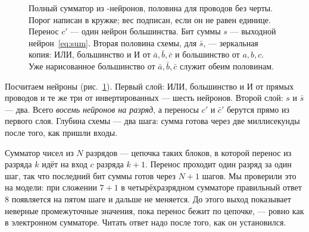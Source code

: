 \begin{figure}[t]
\centering
{}
\caption{Полный сумматор из -нейронов, половина для проводов без черты. Порог написан в кружке; вес подписан, если он не равен единице. Перенос $c'$ --- один нейрон большинства. Бит суммы $s$ --- выходной нейрон~\eqref{eq:sum}. Вторая половина схемы, для $\bar s$, --- зеркальная копия: ИЛИ, большинство и И от $\bar a,\bar b,\bar c$ и большинство от $a,b,c$. Уже нарисованное большинство от $\bar a,\bar b,\bar c$ служит обеим половинам.}
\label{fig:fulladder}
\end{figure}

Посчитаем нейроны (рис.~\ref{fig:fulladder}). Первый слой: ИЛИ, большинство и И от прямых проводов и те же три от инвертированных --- шесть нейронов. Второй слой: $s$ и $\bar s$ --- два. Всего \emph{восемь нейронов на разряд}, а переносы $c'$ и $\bar c'$ берутся прямо из первого слоя. Глубина схемы --- два шага: сумма готова через две миллисекунды после того, как пришли входы.

Сумматор чисел из $N$ разрядов --- цепочка таких блоков, в которой перенос из разряда $k$ идёт на вход $c$ разряда $k+1$. Перенос проходит один разряд за один шаг, так что последний бит суммы готов через $N+1$ шагов. Мы проверили это на модели: при сложении $7+1$ в четырёхразрядном сумматоре правильный ответ $8$ появляется на пятом шаге и дальше не меняется. До этого выход показывает неверные промежуточные значения, пока перенос бежит по цепочке, --- ровно как в электронном сумматоре. Читать ответ надо после того, как он установился.

